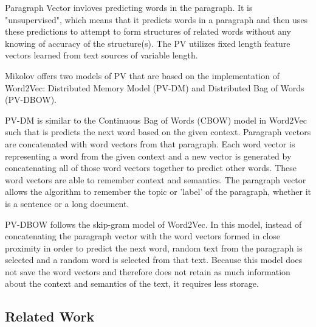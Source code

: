 	Paragraph Vector invloves predicting words in the paragraph. It is "unsupervised", which means that it predicts words in a paragraph and then uses these predictions to attempt to form structures of related words without any knowing of accuracy of the structure(s). The PV utilizes fixed length feature vectors learned from text sources of variable length.
	
	Mikolov offers two models of PV that are based on the implementation of Word2Vec: Distributed Memory Model (PV-DM) and Distributed Bag of Words (PV-DBOW).


PV-DM is similar to the Continuous Bag of Words (CBOW) model in Word2Vec such that is predicts the next word based on the given context. Paragraph vectors are concatenated with word vectors from that paragraph.  Each word vector is representing a word from the given context and a new vector is generated by concatenating all of those word vectors together to predict other words. These word vectors are able to remember context and semantics. The paragraph vector allows the algorithm to remember the topic or 'label' of the paragraph, whether it is a sentence or a long document. 

PV-DBOW follows the skip-gram model of Word2Vec. In this model, instead of concatenating the paragraph vector with the word vectors formed in close proximity in order to predict the next word, random text from the paragraph is selected and a random word is selected from that text. Because this model does not save the word vectors and therefore does not retain as much information about the context and semantics of the text, it requires less storage.


\subsection{Related Work}
